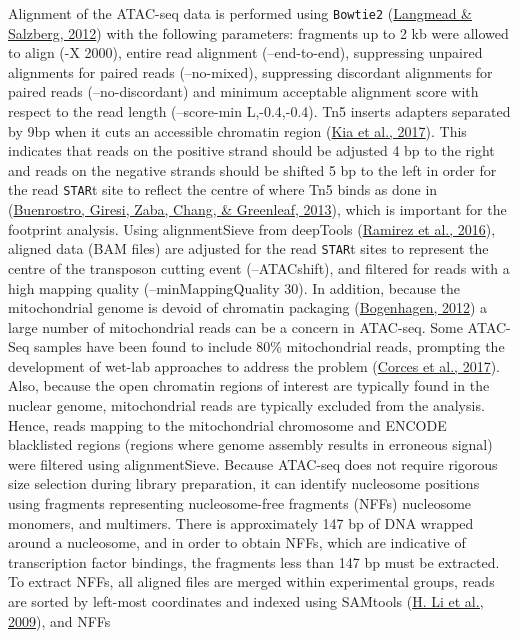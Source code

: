\documentclass[12pt,twoside]{reedthesis}
\begin{document}
Alignment of the ATAC-seq data is performed using \texttt{Bowtie2}
(\protect\hyperlink{ref-langmead2012}{Langmead \& Salzberg, 2012}) with the following parameters: fragments up to 2 kb were
allowed to align (-X 2000), entire read alignment (--end-to-end),
suppressing unpaired alignments for paired reads (--no-mixed),
suppressing discordant alignments for paired reads (--no-discordant) and
minimum acceptable alignment score with respect to the read length
(--score-min L,-0.4,-0.4). Tn5 inserts adapters separated by 9bp when it
cuts an accessible chromatin region (\protect\hyperlink{ref-kia2017}{Kia et al., 2017}). This indicates that
reads on the positive strand should be adjusted 4 bp to the right and
reads on the negative strands should be shifted 5 bp to the left in
order for the read \texttt{STAR}t site to reflect the centre of where Tn5 binds
as done in (\protect\hyperlink{ref-buenrostro2013}{Buenrostro, Giresi, Zaba, Chang, \& Greenleaf, 2013}), which is important for the footprint
analysis. Using alignmentSieve from deepTools (\protect\hyperlink{ref-ramirez2016}{Ramirez et al., 2016}), aligned
data (BAM files) are adjusted for the read \texttt{STAR}t sites to represent the
centre of the transposon cutting event (--ATACshift), and filtered for
reads with a high mapping quality (--minMappingQuality 30). In addition,
because the mitochondrial genome is devoid of chromatin packaging
(\protect\hyperlink{ref-bogenhagen2012}{Bogenhagen, 2012}) a large number of mitochondrial reads can be a concern
in ATAC-seq. Some ATAC-Seq samples have been found to include 80\%
mitochondrial reads, prompting the development of wet-lab approaches to
address the problem (\protect\hyperlink{ref-corces2017}{Corces et al., 2017}). Also, because the open chromatin
regions of interest are typically found in the nuclear genome,
mitochondrial reads are typically excluded from the analysis. Hence,
reads mapping to the mitochondrial chromosome and ENCODE blacklisted
regions (regions where genome assembly results in erroneous signal) were
filtered using alignmentSieve. Because ATAC-seq does not require
rigorous size selection during library preparation, it can identify
nucleosome positions using fragments representing nucleosome-free
fragments (NFFs) nucleosome monomers, and multimers. There is
approximately 147 bp of DNA wrapped around a nucleosome, and in order to
obtain NFFs, which are indicative of transcription factor bindings, the
fragments less than 147 bp must be extracted. To extract NFFs, all
aligned files are merged within experimental groups, reads are sorted by
left-most coordinates and indexed using SAMtools (\protect\hyperlink{ref-li2009}{H. Li et al., 2009}), and NFFs
\end{document}
